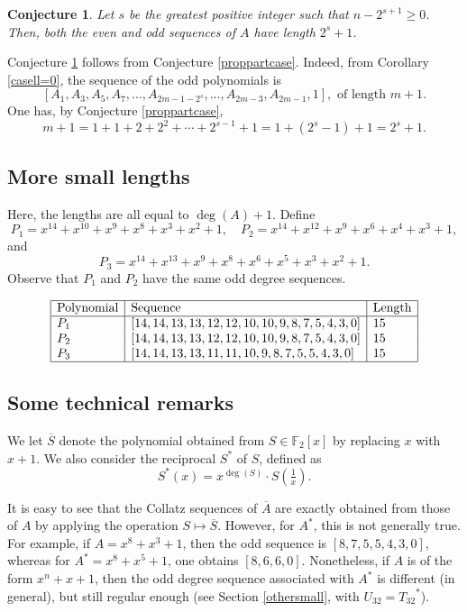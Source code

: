 \documentclass [12pt]{article}
\def\F{\mathbb{F}}
\newtheorem{conjecture}[theorem]{Conjecture}
\begin{document}
\begin{conjecture} \label{theorempartcase}
Let $s$ be the greatest positive integer such that  $n-2^{s+1} \geq 0$. Then,  both the even and odd sequences of $A$ have length $2^s+1$.
\end{conjecture}

Conjecture \ref{theorempartcase} follows from
Conjecture \ref{proppartcase}. Indeed, from Corollary \ref{casell=0}, the sequence of the odd polynomials is
$$[A_1, A_3, A_5, A_7, \ldots, A_{2m-1-2^s}, \ldots,A_{2m-3},A_{2m-1}, 1], \text{  of length $m+1$}.$$
One has, by Conjecture \ref{proppartcase}, $$m+1=1+1+2+2^2+\cdots +2^{s-1} + 1 = 1+(2^s-1) + 1 = 2^s+1.$$

\subsection{More small lengths}
Here, the lengths are all equal to $\deg(A)+1$. Define
\[
P_1=x^{14} + x^{10} + x^9 + x^8 + x^3 + x^2 + 1, \quad 
P_2 = x^{14} + x^{12} + x^9 + x^6 + x^4 + x^3 + 1,
\]
and
\[
P_3 = x^{14} + x^{13} + x^9 + x^8 + x^6 + x^5 + x^3 + x^2 + 1.
\]
Observe that $P_1$ and $P_2$ have the same odd degree sequences.


$$\begin{array}{|l|l|l|}
\hline
\text{Polynomial}&\text{Sequence}&\text{Length}\\
\hline
P_1&[14, 14, 13, 13, 12, 12, 10, 10, 9, 8, 7, 5, 4, 3, 0]&15\\
P_2&[14, 14, 13, 13, 12, 12, 10, 10, 9, 8, 7, 5, 4, 3, 0]&15\\
P_3&[14, 14, 13, 13, 11, 11, 10, 9, 8, 7, 5, 5, 4, 3, 0]&15\\
\hline
\end{array}$$



\subsection{Some technical remarks} \label{remarques}
We let $\overline{S}$ denote the polynomial obtained from $S \in \F_2[x]$ by replacing $x$ with $x+1$. We also consider the reciprocal $S^*$ of $S$, defined as
\[
S^*(x) = x^{\deg(S)} \cdot S \!\left(\tfrac{1}{x}\right).
\]

It is easy to see that the Collatz sequences of $\overline{A}$ are exactly obtained from those of $A$ by applying the operation $S \mapsto \overline{S}$.  
However, for $A^*$, this is not generally true. For example, if $A=x^8+x^3+1$, then the odd sequence is $[8, 7, 5, 5, 4, 3, 0]$, whereas for $A^*=x^8+x^5+1$, one obtains $[8, 6, 6, 0]$.  
Nonetheless, if $A$ is of the form $x^n+x+1$, then the odd degree sequence associated with $A^*$ is different (in general), but still regular enough (see Section \ref{othersmall}, with $U_{32} = {T_{32}}^*$).
\end{document}
